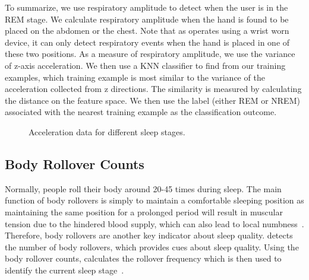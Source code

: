  To summarize, we use respiratory amplitude to detect when the user is in the REM stage.  We calculate respiratory
amplitude when the hand is found to be placed on the abdomen or the chest. {Note that as {\systemname} operates using a wrist worn device,
it can only detect respiratory events when the hand is placed in one of these two positions. As a measure of respiratory amplitude, we use}
the variance of z-axis acceleration. We then use a KNN classifier to find from our training examples, which training example is most
similar to the variance of the acceleration collected from z directions. The similarity is measured by calculating the distance on the
feature space. We then use the label (either REM or NREM) associated with the nearest training example as the classification outcome.

\begin{figure}[!t]
	\centering
	\caption{Acceleration data for different sleep stages.}\label{fig:cordi}
\end{figure}

\subsection{Body Rollover Counts\label{sec:bodyrollover}}

Normally, people roll their body around 20-45 times during sleep. The main function of body rollovers is simply to maintain a comfortable
sleeping position as maintaining the same position for a prolonged period will result in muscular tension due to the hindered blood supply,
which can also lead to local numbness~\cite{rollover2014}. Therefore, body rollovers are another key indicator about sleep quality.
{{\systemname} detects the number of body rollovers, which provides cues about sleep quality. Using the body rollover counts, \systemname
calculates the rollover frequency which is then used to identify the current sleep stage~\cite{rollover2007}}.

